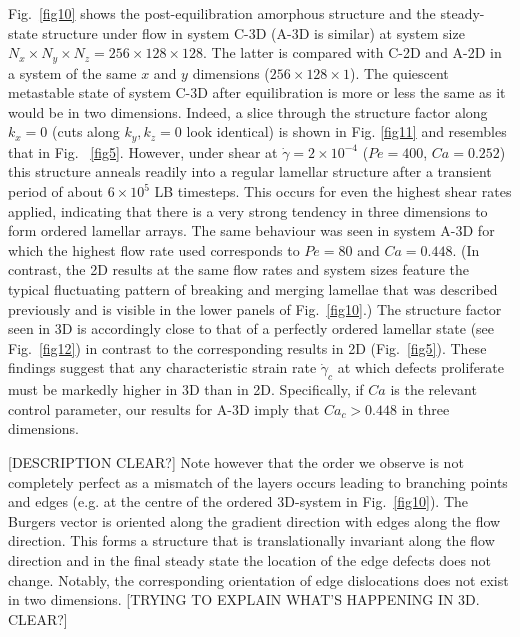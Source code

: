 \documentclass[8.5pt,twoside,twocolumn]{article}
\newcommand{\e}[1]{\times10^{#1}}
\begin{document}
Fig.~\ref{fig10} shows the post-equilibration amorphous structure and the steady-state structure under flow in system C-3D (A-3D is similar) at system size $N_x\times N_y \times N_z=256\times128\times128$. The latter is compared with C-2D and A-2D in a system of the same $x$ and $y$ dimensions ($256\times128\times1$).  The quiescent metastable state of system C-3D after equilibration is more or less the same as it would be in two dimensions. 
Indeed, a slice through the structure factor along $k_x=0$ (cuts along $k_y,k_z=0$ look identical) is shown in Fig. \ref{fig11} and resembles that in Fig.
~\ref{fig5}.
However, under shear at $\dot\gamma = 2\times 10^{-4}$ ($Pe = 400$, $Ca = 0.252$) this structure anneals readily into a regular lamellar structure after a transient period of about $6\e{5}$ LB timesteps. This occurs for even the highest shear rates applied, indicating that there is a very strong tendency in three dimensions to form ordered lamellar arrays. The same behaviour was seen in system A-3D for which the highest flow rate used corresponds to $Pe = 80$ and $Ca = 0.448$. (In contrast, the 2D results at the same flow rates and system sizes feature the typical fluctuating pattern of breaking and merging lamellae that was described previously and is visible in the lower panels of Fig.~\ref{fig10}.) The structure factor seen in 3D is accordingly close to that of a perfectly ordered lamellar state (see Fig.~\ref{fig12}) in contrast to the corresponding results in 2D (Fig.~\ref{fig5}).
These findings suggest that any characteristic strain rate $\dot\gamma_c$ at which defects proliferate must be markedly higher in 3D than in 2D. Specifically, if $Ca$ is the relevant control parameter, our results for A-3D imply that $Ca_c > 0.448 $ in three dimensions.

[DESCRIPTION CLEAR?] Note however that the order we observe is not completely perfect as a mismatch of the layers occurs leading to branching points and edges (e.g. at the centre of the ordered 3D-system in Fig.~\ref{fig10}). 
The Burgers vector is oriented along the gradient direction with edges along the flow direction.
This forms a structure that is translationally invariant along the flow direction and in the final steady state the location of the edge defects does not change. Notably, the corresponding orientation of edge dislocations does not exist in two dimensions.
[TRYING TO EXPLAIN WHAT'S HAPPENING IN 3D. CLEAR?]
\end{document}
